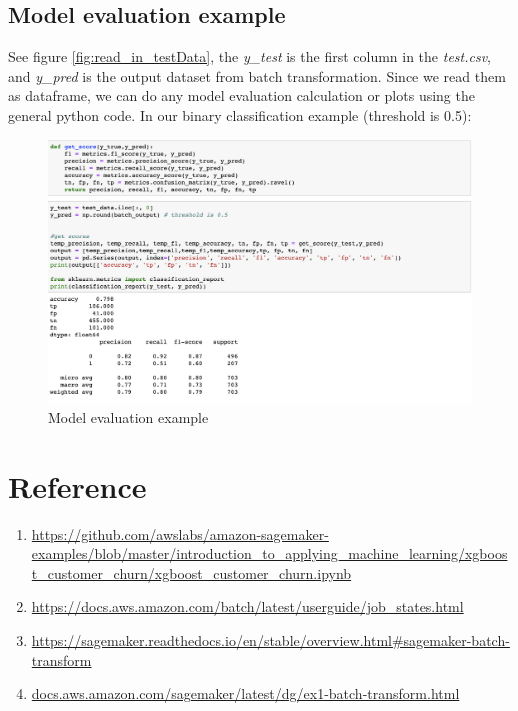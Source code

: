 \documentclass[12pt]{article}
\begin{document}
\subsection{Model evaluation example}
See figure \ref{fig:read_in_testData}, the \textit{y\_test} is the first column in the \textit{test.csv}, and \textit{y\_pred} is the output dataset from batch transformation. Since we read them as dataframe, we can do any model evaluation calculation or plots using the general python code. In our binary classification example (threshold is 0.5):

\begin{figure}[H]
\centering
\begin{minipage}{1\textwidth}
  \centering
  \includegraphics[width=1\linewidth]{validation_example.png}
   \caption{Model evaluation example}
   \label{fig:validation_example}
\end{minipage}%
\end{figure}
\noindent




\newpage
\section{Reference}

\begin{enumerate}
\item \url{https://github.com/awslabs/amazon-sagemaker-examples/blob/master/introduction_to_applying_machine_learning/xgboost_customer_churn/xgboost_customer_churn.ipynb}

\item \url{https://docs.aws.amazon.com/batch/latest/userguide/job_states.html}

\item \url{https://sagemaker.readthedocs.io/en/stable/overview.html#sagemaker-batch-transform}


\item \url{docs.aws.amazon.com/sagemaker/latest/dg/ex1-batch-transform.html}

\end{enumerate}






\setlength{\parskip}{1em}
\end{document}
